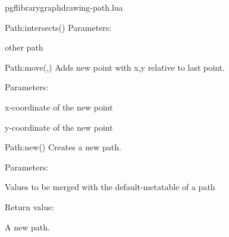 \begin{filedescription}{pgflibrarygraphdrawing-path.lua}
\begin{luacommand}{{Path:intersects}()}
Parameters:
\begin{parameterdescription}
	\item[\meta{path}] other path
\end{parameterdescription}



\end{luacommand}
\begin{luacommand}{{Path:move}(,)}
Adds new point with x,y relative to last point.

Parameters:
\begin{parameterdescription}
	\item[\meta{x}] x-coordinate of the new point\item[\meta{y}] y-coordinate of the new point
\end{parameterdescription}



\end{luacommand}
\begin{luacommand}{{Path:new}()}
Creates a new path.

Parameters:
\begin{parameterdescription}
	\item[\meta{values}] Values to be merged with the default-metatable of a path
\end{parameterdescription}


Return value:
\begin{parameterdescription} 
  \item[] A new path.
\end{parameterdescription}


\end{luacommand}

\end{filedescription}